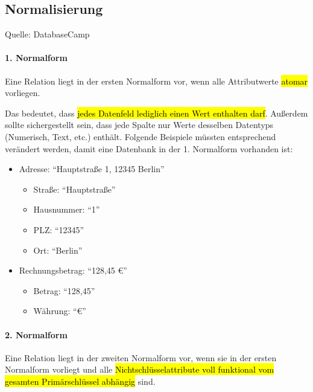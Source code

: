 \subsection{Normalisierung}
\label{sec:Normalisierung}

Quelle: DatabaseCamp \cite{normalisierung}

\paragraph{1. Normalform} Eine Relation liegt in der ersten Normalform vor, wenn alle Attributwerte \hl{atomar} vorliegen.

Das bedeutet, dass \hl{jedes Datenfeld lediglich einen Wert enthalten darf}. Außerdem sollte sichergestellt sein, dass jede Spalte nur Werte desselben Datentyps (Numerisch, Text, etc.) enthält. Folgende Beispiele müssten entsprechend verändert werden, damit eine Datenbank in der 1. Normalform vorhanden ist:

\begin{multicols}{2}
	\begin{itemize}
		\item Adresse: “Hauptstraße 1, 12345 Berlin” 
		\begin{itemize}
			\item Straße: “Hauptstraße” 
			\item Hausnummer: “1”
			\item PLZ: “12345”
			\item Ort: “Berlin”
		\end{itemize}
		\columnbreak
		\item Rechnungsbetrag: “128,45 €”
		\begin{itemize}
			\item Betrag: “128,45”
			\item Währung: “€”
			\vfill
		\end{itemize}
	\end{itemize}
\end{multicols}

\paragraph{2. Normalform} Eine Relation liegt in der zweiten Normalform vor, wenn sie in der ersten Normalform vorliegt und alle \hl{Nichtschlüsselattribute voll funktional vom gesamten Primärschlüssel abhängig} sind.


